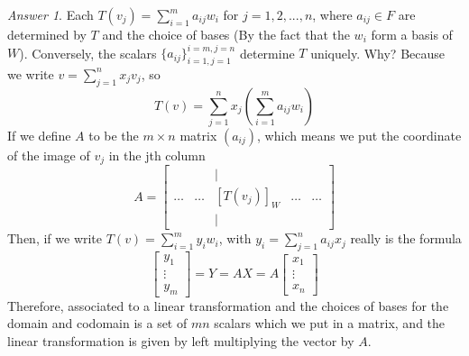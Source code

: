 \documentclass[12pt]{article}
\theoremstyle{definition}
\theoremstyle{remark}
\newtheorem*{ans}{Answer}
\numberwithin{equation}{section}
\begin{document}
\begin{figure}[H]
        \centering
\end{figure}
\begin{ans}
        Each $T(v_j) = \sum\limits_{i=1}^m a_{ij}w_i$ for $j = 1,2,...,n$, where $a_{ij} \in F$ are determined by $T$ and the choice of bases (By the fact that the $w_i$ form a basis of $W$). Conversely, the scalars $\{a_{ij}\}_{i=1,j=1}^{i=m,j=n}$ determine $T$ uniquely. Why? Because we write $v = \sum\limits_{j=1}^nx_jv_j$, so \begin{equation}
                T(v) = \sum\limits_{j=1}^nx_j\left(\sum\limits_{i=1}^ma_{ij}w_i\right)
        \end{equation}
        If we define $A$ to be the $m\times n$ matrix $(a_{ij})$, which means we put the coordinate of the image of $v_j$ in the jth column \begin{equation}
                A = \begin{bmatrix}  & & \Big\vert & & \\ \hdots & \hdots & [T(v_j)]_W & \hdots & \hdots \\ & & \Big\vert & & \end{bmatrix}
        \end{equation}
        Then, if we write $T(v) = \sum\limits_{i=1}^my_iw_i$, with $y_i = \sum\limits_{j=1}^n a_{ij}x_j$ really is the formula \begin{equation}
                \begin{bmatrix} y_1 \\ \vdots \\ y_m \end{bmatrix} = Y = AX = A\begin{bmatrix} x_1 \\ \vdots \\ x_n \end{bmatrix}
        \end{equation}
        Therefore, associated to a linear transformation and the choices of bases for the domain and codomain is a set of $mn$ scalars which we put in a matrix, and the linear transformation is given by left multiplying the vector by $A$.
\end{ans}
\end{document}
